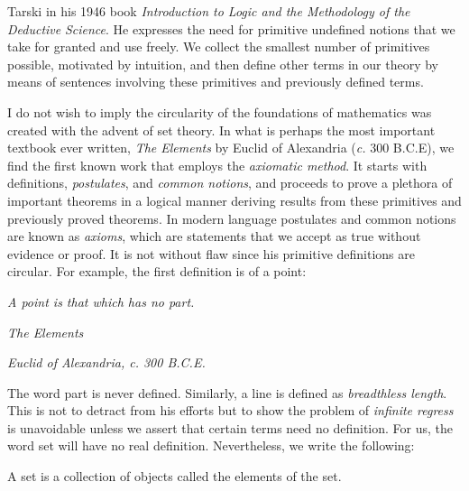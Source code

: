         Tarski in his 1946 book
        \textit{Introduction to Logic and the Methodology of the Deductive}
        \textit{Science}. He expresses the need for primitive
        undefined notions that we take for granted and use freely. We collect
        the smallest number of primitives possible, motivated by intuition, and
        then define other terms in our theory by means of sentences involving
        these primitives and previously defined terms.
        \par\hfill\par
        I do not wish to imply the circularity of the foundations of
        mathematics was created with the advent of set theory. In what is
        perhaps the most important textbook ever written,
        \textit{The Elements} by Euclid of
        Alexandria (\textit{c.} 300 B.C.E), we find
        the first known work that employs the
        \textit{axiomatic method}. It
        starts with definitions, \textit{postulates}, and
        \textit{common notions}, and proceeds to prove a plethora of important
        theorems in a logical manner deriving results from these primitives and
        previously proved theorems. In modern language postulates and common
        notions are known as \textit{axioms}, which are statements that we
        accept as true without evidence or proof. It is not without flaw since
        his primitive definitions are circular. For example, the
        first definition is of a point:
        \begin{center}
            \textit{A point is that which has no part.}
            \par
            \hfill\textit{The Elements}\par
            \hfill\textit{Euclid of Alexandria, c. 300 B.C.E.}
        \end{center}
        The word part is never defined. Similarly, a line is defined as
        \textit{breadthless length}. This is not to detract from his efforts but
        to show the problem of \textit{infinite regress}
        is unavoidable unless we assert that certain terms need no definition.
        For us, the word set will have no real definition. Nevertheless, we
        write the following:
        \begin{definition}
            \label{def:Set}%
            A \gls{set} is a collection of objects called the elements of the
            set.
        \end{definition}
